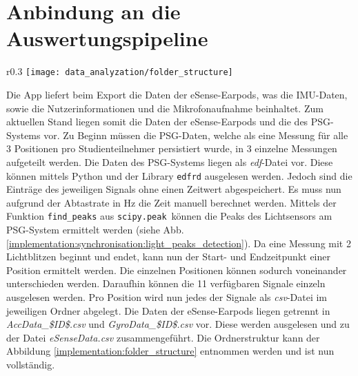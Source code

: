 \section{Anbindung an die Auswertungspipeline}
\label{ch:Implementierung:way_to_pipeline}
\begin{wrapfigure}{r}{0.3\textwidth}
  \centering
  \texttt{[image: data\_analyzation/folder\_structure]}
  \caption{Ornderstruktur des Datensatzes}
  \label{implementation:folder_structure}
\end{wrapfigure}
Die App liefert beim Export die Daten der eSense-Earpods, was die IMU-Daten, sowie die Nutzerinformationen und die Mikrofonaufnahme beinhaltet.
Zum aktuellen Stand liegen somit die Daten der eSense-Earpods und die des PSG-Systems vor. 
Zu Beginn müssen die PSG-Daten, welche als eine Messung für alle 3 Positionen pro Studienteilnehmer persistiert wurde, in 3 einzelne Messungen aufgeteilt werden.
Die Daten des PSG-Systems liegen als \textit{edf}-Datei vor. 
Diese können mittels Python und der Library \texttt{edfrd} ausgelesen werden.
Jedoch sind die Einträge des jeweiligen Signals ohne einen Zeitwert abgespeichert. 
Es muss nun aufgrund der Abtastrate in $\si{\hertz}$ die Zeit manuell berechnet werden. 
Mittels der Funktion \texttt{find\_peaks} aus \texttt{scipy.peak}\ können die Peaks des Lichtsensors am PSG-System ermittelt werden (siehe Abb. \ref{implementation:synchronisation:light_peaks_detection}).
Da eine Messung mit 2 Lichtblitzen beginnt und endet, kann nun der Start- und Endzeitpunkt einer Position ermittelt werden. 
Die einzelnen Positionen können sodurch voneinander unterschieden werden. 
Daraufhin können die 11 verfügbaren Signale einzeln ausgelesen werden.
Pro Position wird nun jedes der Signale als \textit{csv}-Datei im jeweiligen Ordner abgelegt.
Die Daten der eSense-Earpods liegen getrennt in \textit{AccData\_\$ID\$.csv} und \textit{GyroData\_\$ID\$.csv} vor. 
Diese werden ausgelesen und zu der Datei \textit{eSenseData.csv} zusammengeführt.
Die Ordnerstruktur kann der Abbildung \ref{implementation:folder_structure} entnommen werden und ist nun vollständig.

